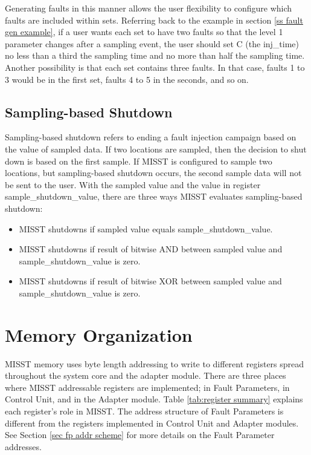 \documentclass[]{report}
\begin{document}
Generating faults in this manner allows the user flexibility to configure which faults are included within sets. Referring back to the example in section \ref{ss fault gen example}, if a user wants each set to have two faults so that the level 1 parameter changes after a sampling event, the user should set C (the inj\_time) no less than a third the sampling time and no more than half the sampling time. Another possibility is that each set contains three faults. In that case, faults 1 to 3 would be in the first set, faults 4 to 5 in the seconds, and so on.  

\clearpage
\subsection{Sampling-based Shutdown}
\label{ss samping-based shutdown}

Sampling-based shutdown refers to ending a fault injection campaign based on the value of sampled data. If two locations are sampled, then the decision to shut down is based on the first sample. If MISST is configured to sample two locations, but sampling-based shutdown occurs, the second sample data will not be sent to the user. With the sampled value and the value in register sample\_shutdown\_value, there are three ways MISST evaluates sampling-based shutdown:
\begin{itemize}
	\item MISST shutdowns if sampled value equals sample\_shutdown\_value.
	\item MISST shutdowns if result of bitwise AND between sampled value and sample\_shutdown\_value is zero.
	\item MISST shutdowns if result of bitwise XOR between sampled value and sample\_shutdown\_value is zero.
\end{itemize}

\section{Memory Organization}

MISST memory uses byte length addressing to write to different registers spread throughout the system core and the adapter module. There are three places where MISST addressable registers are implemented; in Fault Parameters, in Control Unit, and in the Adapter module. Table \ref{tab:register summary} explains each register's role in MISST. The address structure of Fault Parameters is different from the registers implemented in Control Unit and Adapter modules. See Section \ref{sec fp addr scheme} for more details on the Fault Parameter addresses. 
\end{document}
